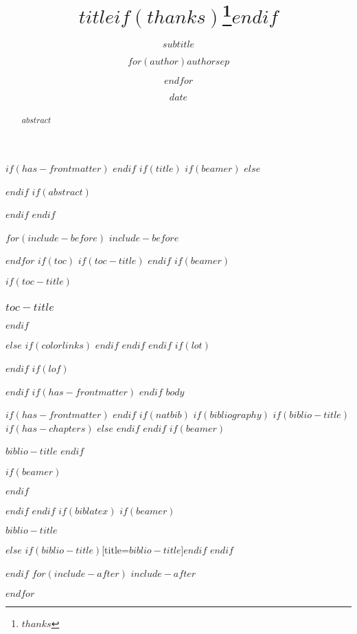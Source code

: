 \documentclass[
$if(fontsize)$
  $fontsize$,
$endif$
$if(lang)$
  $babel-lang$,
$endif$
$if(papersize)$
  $papersize$paper,
$endif$
$if(beamer)$
  ignorenonframetext,
$if(handout)$
  handout,
$endif$
$if(aspectratio)$
  aspectratio=$aspectratio$,
$endif$
$endif$
$for(classoption)$
  $classoption$$sep$,
$endfor$
]{$documentclass$}
\title{$title$$if(thanks)$\thanks{$thanks$}$endif$}
\subtitle{$subtitle$}
\author{$for(author)$$author$$sep$ \and $endfor$}
\date{$date$}
\institute{$for(institute)$$institute$$sep$ \and $endfor$}
\newif\ifbibliography
\begin{document}
$if(has-frontmatter)$
\frontmatter
$endif$
$if(title)$
$if(beamer)$
\frame{\titlepage}
$else$
\maketitle

$endif$
$if(abstract)$
\begin{abstract}
$abstract$
\end{abstract}
$endif$
$endif$

$for(include-before)$
$include-before$

$endfor$
$if(toc)$
$if(toc-title)$
\renewcommand*\contentsname{$toc-title$}
$endif$
$if(beamer)$
\begin{frame}[allowframebreaks]
$if(toc-title)$
  \frametitle{$toc-title$}
$endif$
  \tableofcontents[hideallsubsections]
\end{frame}
$else$
{
$if(colorlinks)$
\hypersetup{linkcolor=$if(toccolor)$$toccolor$$else$$endif$}
$endif$
\setcounter{tocdepth}{$toc-depth$}
\tableofcontents
}
$endif$
$endif$
$if(lot)$
\listoftables
$endif$
$if(lof)$
\listoffigures
$endif$
$if(has-frontmatter)$
\pagestyle{myheadings} %
\mainmatter
$endif$
$body$

$if(has-frontmatter)$
\backmatter
$endif$
$if(natbib)$
$if(bibliography)$
$if(biblio-title)$
$if(has-chapters)$
\renewcommand\bibname{$biblio-title$}
$else$
\renewcommand\refname{$biblio-title$}
$endif$
$endif$
$if(beamer)$
\begin{frame}[allowframebreaks]{$biblio-title$}
  \bibliographytrue
$endif$
  
$if(beamer)$
\end{frame}
$endif$

$endif$
$endif$
$if(biblatex)$
$if(beamer)$
\begin{frame}[allowframebreaks]{$biblio-title$}
  \bibliographytrue
  \printbibliography[heading=none]
\end{frame}
$else$
\printbibliography$if(biblio-title)$[title=$biblio-title$]$endif$
$endif$

$endif$
$for(include-after)$
$include-after$

$endfor$
\end{document}

